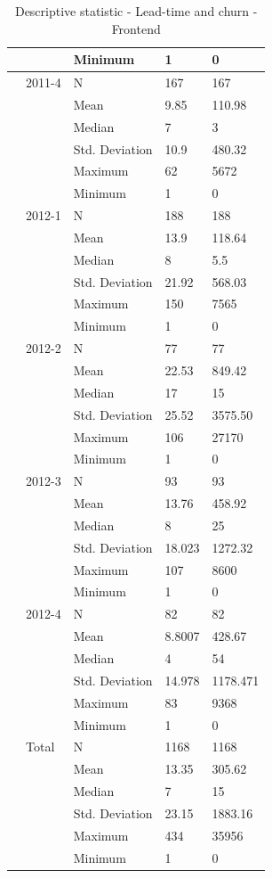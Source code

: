 \documentclass[UKenglish]{ifimaster}  %
\begin{document}
\begin{table}[!htbp]
\begin{adjustwidth}{-1cm}{}
{\begin{tabular}{ | l | l | l | l | l | }
	 &  & Minimum & 1 & 0 \\ \hline
	 & 2011-4 & N & 167 & 167 \\ \hline
	 &  & Mean & 9.85 & 110.98 \\ \hline
	 &  & Median & 7 & 3 \\ \hline
	 &  & Std. Deviation & 10.9 & 480.32 \\ \hline
	 &  & Maximum & 62 & 5672 \\ \hline
	 &  & Minimum & 1 & 0 \\ \hline
	 & 2012-1 & N & 188 & 188 \\ \hline
	 &  & Mean & 13.9 & 118.64 \\ \hline
	 &  & Median & 8 & 5.5 \\ \hline
	 &  & Std. Deviation & 21.92 & 568.03 \\ \hline
	 &  & Maximum & 150 & 7565 \\ \hline
	 &  & Minimum & 1 & 0 \\ \hline
	 & 2012-2 & N & 77 & 77 \\ \hline
	 &  & Mean & 22.53 & 849.42 \\ \hline
	 &  & Median & 17 & 15 \\ \hline
	 &  & Std. Deviation & 25.52 & 3575.50 \\ \hline
	 &  & Maximum & 106 & 27170 \\ \hline
	 &  & Minimum & 1 & 0 \\ \hline
	 & 2012-3 & N & 93 & 93 \\ \hline
	 &  & Mean & 13.76 & 458.92 \\ \hline
	 &  & Median & 8 & 25 \\ \hline
	 &  & Std. Deviation & 18.023 & 1272.32 \\ \hline
	 &  & Maximum & 107 & 8600 \\ \hline
	 &  & Minimum & 1 & 0 \\ \hline
	 & 2012-4 & N & 82 & 82 \\ \hline
	 &  & Mean & 8.8007 & 428.67 \\ \hline
	 &  & Median & 4 & 54 \\ \hline
	 &  & Std. Deviation & 14.978& 1178.471 \\ \hline
	 &  & Maximum & 83 & 9368 \\ \hline
	 &  & Minimum & 1 & 0 \\ \hline
	 & Total & N & 1168 & 1168 \\ \hline
	 &  & Mean & 13.35 & 305.62 \\ \hline
	 &  & Median & 7 & 15 \\ \hline
	 &  & Std. Deviation & 23.15 & 1883.16 \\ \hline
	 &  & Maximum & 434 & 35956 \\ \hline
	 &  & Minimum & 1 & 0 \\ \hline
\end{tabular}
}
\caption{Descriptive statistic  - Lead-time and churn - Frontend}
\end{adjustwidth}
 \end{table}%
 
\end{document}
